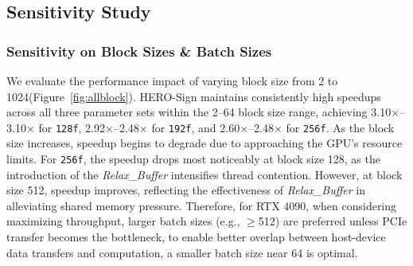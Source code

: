 \documentclass[10pt,conference]{IEEEtran}
\begin{document}




\subsection{Sensitivity Study}
\label{sec:ss}


\subsubsection{Sensitivity on Block Sizes \& Batch Sizes}
\label{sec:s1}

We evaluate the performance impact of varying block size from 2 to 1024(Figure~\ref{fig:allblock}). HERO-Sign maintains consistently high speedups across all three parameter sets within the 2–64 block size range, achieving 3.10$\times$–3.10$\times$ for \texttt{128f}, 2.92$\times$–2.48$\times$ for \texttt{192f}, and 2.60$\times$–2.48$\times$ for \texttt{256f}. As the block size increases, speedup begins to degrade due to approaching the GPU’s resource limits. For \texttt{256f}, the speedup drops most noticeably at block size 128, as the introduction of the \textit{Relax\_Buffer} intensifies thread contention. However, at block size 512, speedup improves, reflecting the effectiveness of \textit{Relax\_Buffer} in alleviating shared memory pressure. Therefore, for RTX 4090, when considering maximizing throughput, larger batch sizes (e.g., $\geq$512) are preferred unless PCIe transfer becomes the bottleneck, to enable better overlap between host-device data transfers and computation, a smaller batch size near 64 is optimal.
\end{document}
